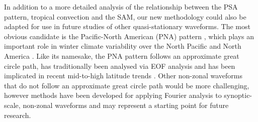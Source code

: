 In addition to a more detailed analysis of the relationship between the PSA pattern, tropical convection and the SAM, our new methodology could also be adapted for use in future studies of other quasi-stationary waveforms. The most obvious candidate is the Pacific-North American (PNA) pattern \citep{Wallace1981}, which plays an important role in winter climate variability over the North Pacific and North America \citep[e.g.][]{Notaro2006}. Like its namesake, the PNA pattern follows an approximate great circle path, has traditionally been analysed via EOF analysis and has been implicated in recent mid-to-high latitude trends \citep[e.g.][]{Ding2014,Liu2015}. Other non-zonal waveforms that do not follow an approximate great circle path would be more challenging, however methods have been developed for applying Fourier analysis to synoptic-scale, non-zonal waveforms \citep{Zimin2006,Souders2014} and may represent a starting point for future research. 

